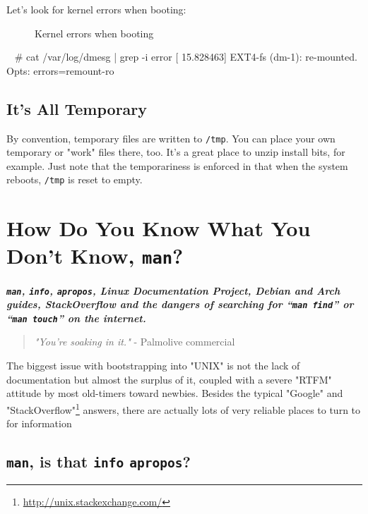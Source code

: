 \documentclass[10pt,american,]{book}
\newenvironment{Shaded}{\begin{snugshade}}{\end{snugshade}}
\newcommand{\KeywordTok}[1]{\textcolor[rgb]{0.13,0.29,0.53}{\textbf{{#1}}}}
\newcommand{\CommentTok}[1]{\textcolor[rgb]{0.56,0.35,0.01}{\textit{{#1}}}}
\newcommand{\NormalTok}[1]{{#1}}
\renewcommand{\href}[2]{#2\footnote{\url{#1}}}
\numberwithin{figure}{chapter}
\DeclareRobustCommand{\drcap}[1]{\begin{figure}[H]\caption{#1}\end{figure}}
\renewcommand{\KeywordTok}[1]{{#1}}
\renewcommand{\CommentTok}[1]{{#1}}
\renewcommand{\NormalTok}[1]{{#1}}
\begin{document}
Let's look for kernel errors when booting:

\drcap{Kernel errors when booting}

\begin{Shaded}
\begin{Highlighting}[]
\KeywordTok{~} \CommentTok{# cat /var/log/dmesg | grep -i error}
\KeywordTok{[}   \NormalTok{15.828463] EXT4-fs (dm-1): re-mounted. Opts: errors=remount-ro}
\end{Highlighting}
\end{Shaded}

\section*{It's All Temporary}\label{its-all-temporary}

By convention, temporary files are written to \texttt{/tmp}.
You can place your own temporary or "work" files there, too. It's a
great place to unzip install bits, for example. Just note that the
temporariness is enforced in that when the system reboots, \texttt{/tmp}
is reset to empty.

\hypertarget{how-do-you-know-what-you-dont-know-man}{\chapter{\texorpdfstring{How
Do You Know What You Don’t Know,
\texttt{man}?}{How Do You Know What You Don’t Know, man?}}\label{how-do-you-know-what-you-dont-know-man}}

\textbf{\emph{\texttt{man}, \texttt{info}, \texttt{apropos}, Linux
Documentation Project, Debian and Arch guides, StackOverflow and the
dangers of searching for “\texttt{man\ find}” or “\texttt{man\ touch}”
on the internet.}}

\begin{quote}
\emph{"You're soaking in it."} - Palmolive commercial
\end{quote}

The biggest issue with bootstrapping into "UNIX" is not the lack of
documentation but almost the surplus of it, coupled with a severe "RTFM"
attitude by most old-timers toward newbies. Besides the typical "Google"
and
\href{http://unix.stackexchange.com/}{"StackOverflow"}
answers, there are actually lots of very reliable places to turn to for
information

\section*{\texorpdfstring{\texttt{man}, is that \texttt{info}
\texttt{apropos}?}{man, is that info apropos?}}\label{man-is-that-info-apropos}
\end{document}
